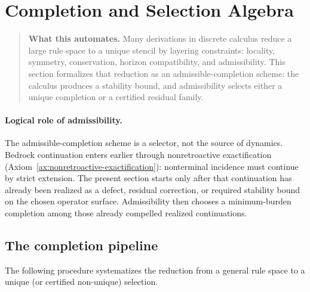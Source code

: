 \section{Completion and Selection Algebra}
\label{sec:constraint-compiler}

\begin{quote}\small
\textbf{What this automates.}
Many derivations in discrete calculus reduce a large rule space to a unique stencil by layering constraints: locality, symmetry, conservation, horizon compatibility, and admissibility.
This section formalizes that reduction as an admissible-completion scheme: the calculus produces a stability bound, and admissibility selects either a unique completion or a certified residual family.
\end{quote}

\paragraph{Logical role of admissibility.}
The admissible-completion scheme is a selector, not the source of dynamics.
Bedrock continuation enters earlier through nonretroactive exactification
(Axiom~\ref{ax:nonretroactive-exactification}): nonterminal incidence must
continue by strict extension. The present section starts only after that
continuation has already been realized as a defect, residual correction, or
required stability bound on the chosen operator surface. Admissibility then
chooses a minimum-burden completion among those already compelled realized
continuations.

\subsection{The completion pipeline}

The following procedure systematizes the reduction from a general rule space to a unique (or certified non-unique) selection.

